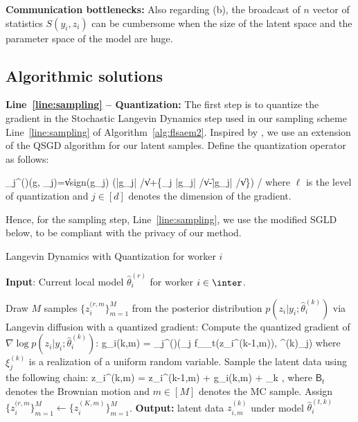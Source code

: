 \documentclass[11pt]{article}
\theoremstyle{t}
\begin{document}
\textbf{Communication bottlenecks:} Also regarding (b), the broadcast of $n$ vector of statistics $S(y_i,z_i)$ can be cumbersome when the size of the latent space and the parameter space of the model are huge.

\subsection{Algorithmic solutions}

\textbf{Line~\ref{line:sampling} -- Quantization:} 
The first step is to quantize the gradient in the Stochastic Langevin Dynamics step used in our sampling scheme Line~\ref{line:sampling} of Algorithm~\ref{alg:flsaem2}.
Inspired by \citep{alistarh2017qsgd}, we use an extension of the QSGD algorithm for our latent samples.
Define the quantization operator as follows:

\beq\label{eq:operator}
_{j}^{(\ell)}\left(g, \xi_{j}\right)=\|v\| \cdot \textrm{sign}\left(g_{j}\right) \cdot\left(\left\lfloor \ell \left|g_{j}\right| /\|v\|\right\rfloor+\left\{\xi_{j} \leq \ell \left|g_{j}\right| /\|v\|-\left\lfloor \ell \left|g_{j}\right| /\|v\|\right\rfloor\right\}\right) /\ell
\eeq
where $\ell$ is the level of quantization and $j \in [d]$ denotes the dimension of the gradient.

Hence, for the sampling step, Line~\ref{line:sampling}, we use the modified SGLD below, to be compliant with the privacy of our method.
\begin{algorithm}[H]
\caption{Langevin Dynamics with Quantization for worker $i$} \label{alg:quant}
\begin{algorithmic}[1]
\STATE \textbf{Input}: Current local model $\hat{\theta}^{(r)}_i$ for worker $i \in \inter$.

\STATE Draw $M$ samples $\{ z_{i}^{(r,m} \}_{m=1}^M$ from the posterior distribution $p(z_i| y_i; \hat{\theta}^{(k)}_i)$ via Langevin diffusion with a quantized gradient:\label{line:langevin}
\STATE Compute the quantized gradient of $\nabla \log p(z_i| y_i; \hat{\theta}^{(k)}_i)$:
\beq\label{eq:grad}
g_i{(k,m)} = _{j}^{(\ell)}\left(\nabla_j f_{\theta_t}(z_i^{(k-1,m)}), \xi^{(k)}_{j}\right)
\eeq
where $\xi^{(k)}_{j}$ is a realization of a uniform random variable.
\STATE Sample the latent data using the following chain:
\beq\label{eq:lang}
z_i^{(k,m)} = z_i^{(k-1,m)} +   g_i{(k,m)} +   _k \eqsp,
\eeq
where $\mathsf{B}_t$ denotes the Brownian motion and $m \in [M]$ denotes the MC sample.
\ENDFOR
\STATE Assign $\{ z_{i}^{(r,m} \}_{m=1}^M \leftarrow \{ z_i^{(K,m)} \}_{m=1}^M$.
\STATE \textbf{Output:} latent data $z_{i,m}^{(k)}$ under model $\hat{\theta}^{(t,k)}_i$ 
\end{algorithmic}
\end{algorithm}
\end{document}
